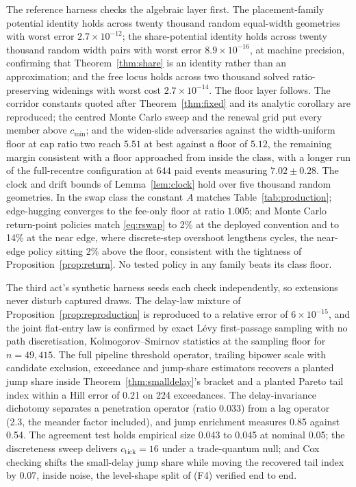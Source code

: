 \documentclass[11pt,a4paper]{article}
\theoremstyle{definition}
\theoremstyle{plain}
\theoremstyle{remark}
\begin{document}
The reference harness checks the algebraic layer first. The placement-family potential identity holds across twenty thousand random equal-width geometries with worst error $2.7\times10^{-12}$; 
the share-potential identity holds across twenty thousand random width pairs with worst error $8.9\times10^{-16}$, at machine precision, confirming that Theorem~\ref{thm:share} is an identity 
rather than an approximation; and the free locus holds across two thousand solved ratio-preserving widenings with worst cost $2.7\times10^{-14}$. The floor layer follows. The corridor constants 
quoted after Theorem~\ref{thm:fixed} and its analytic corollary are reproduced; the centred Monte Carlo sweep and the renewal grid put every member above $c_{\min}$; and the widen-slide 
adversaries against the width-uniform floor at cap ratio two reach $5.51$ at best against a floor of $5.12$, the remaining margin consistent with a floor approached from inside the class, 
with a longer run of the full-recentre configuration at $644$ paid events measuring $7.02 \pm 0.28$. The clock and drift bounds of Lemma~\ref{lem:clock} hold over five thousand random geometries. 
In the swap class the constant $A$ matches Table~\ref{tab:production}; edge-hugging converges to the fee-only floor at ratio $1.005$; and Monte Carlo return-point policies match 
\eqref{eq:rswap} to 2\% at the deployed convention and to 14\% at the near edge, where discrete-step overshoot lengthens cycles, the near-edge policy sitting 2\% above the floor, 
consistent with the tightness of Proposition~\ref{prop:return}. No tested policy in any family beats its class floor.

The third act's synthetic harness seeds each check independently, so extensions never disturb captured draws. The delay-law mixture of Proposition~\ref{prop:reproduction} is reproduced to a relative 
error of $6 \times 10^{-15}$, and the joint flat-entry law is confirmed by exact L\'evy first-passage sampling with no path discretisation, Kolmogorov--Smirnov statistics at the sampling floor for $n = 49{,}415$. 
The full pipeline threshold operator, trailing bipower scale with candidate exclusion, exceedance and jump-share estimators recovers a planted jump share inside Theorem~\ref{thm:smalldelay}'s bracket 
and a planted Pareto tail index within a Hill error of 0.21 on 224 exceedances. The delay-invariance dichotomy separates a penetration operator (ratio 0.033) from a lag operator (2.3, the meander 
factor included), and jump enrichment measures 0.85 against 0.54. The agreement test holds empirical size 0.043 to 0.045 at nominal 0.05; the discreteness sweep delivers $c_{\mathrm{tick}} = 16$ under a 
trade-quantum null; and Cox checking shifts the small-delay jump share while moving the recovered tail index by 0.07, inside noise, the level-shape split of (F4) verified end to end.
\end{document}
